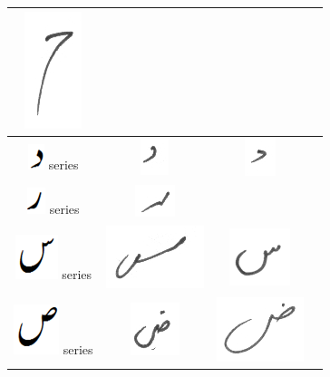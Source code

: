 \documentclass[a4paper,conference]{IEEEtran}
\begin{document}
\begin{table}[h]
\begin{tabular}{@{}cccc@{}}
\includegraphics[scale=0.15]{157}  \\
\hline
\includegraphics[scale=0.25]{daal_orig} series & \includegraphics[scale=0.15]{158} & \includegraphics[scale=0.15]{159}  &  \\
\hline
\includegraphics[scale=0.25]{re_orig} series & \includegraphics[scale=0.15]{160} &  &  \\
\hline
\includegraphics[scale=0.25]{seen_orig} series & \includegraphics[scale=0.15]{161} & 
\includegraphics[scale=0.20]{162} &  \\
\hline
\includegraphics[scale=0.20]{suad_orig} series & \includegraphics[scale=0.15]{163} & \includegraphics[scale=0.15]{164} &  \\

\end{tabular}
\end{table}
\end{document}

